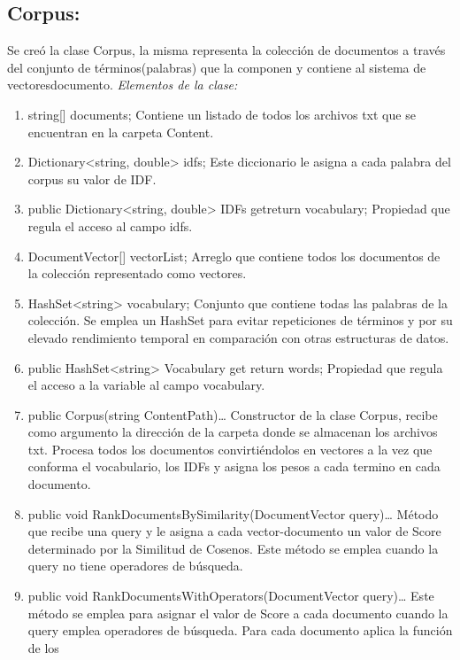 \documentclass[a4paper,12pt]{article}
\begin{document}
\subsection{Corpus:}
 Se creó la clase Corpus, la misma representa la colección de documentos a través
del conjunto de términos(palabras) que la componen y contiene al sistema de vectoresdocumento.
\emph{Elementos de la clase:}
\begin{enumerate}
     
    \item string[] documents;
        Contiene un listado de todos los archivos txt que se encuentran en la carpeta Content.
    \item Dictionary<string, double> idfs;
        Este diccionario le asigna a cada palabra del corpus su valor de IDF.
    \item public Dictionary<string, double> IDFs { get{return vocabulary;}}
        Propiedad que regula el acceso al campo idfs.
    \item DocumentVector[] vectorList;
        Arreglo que contiene todos los documentos de la colección representado como vectores.
    \item HashSet<string> vocabulary;
        Conjunto que contiene todas las palabras de la colección. Se emplea un HashSet para
        evitar repeticiones de términos y por su elevado rendimiento temporal en comparación
        con otras estructuras de datos.
    \item public HashSet<string> Vocabulary { get{ return words;}}
        Propiedad que regula el acceso a la variable al campo vocabulary.
    \item public Corpus(string ContentPath){…}
        Constructor de la clase Corpus, recibe como argumento la dirección de la carpeta donde
        se almacenan los archivos txt. Procesa todos los documentos convirtiéndolos en vectores
        a la vez que conforma el vocabulario, los IDFs y asigna los pesos a cada termino en cada
        documento.
    \item public void RankDocumentsBySimilarity(DocumentVector query){…}
        Método que recibe una query y le asigna a cada vector-documento un valor de Score
        determinado por la Similitud de Cosenos. Este método se emplea cuando la query no
        tiene operadores de búsqueda.
    \item public void RankDocumentsWithOperators(DocumentVector query){…}
        Este método se emplea para asignar el valor de Score a cada documento cuando la
        query emplea operadores de búsqueda. Para cada documento aplica la función de los

\end{enumerate}
\end{document}
